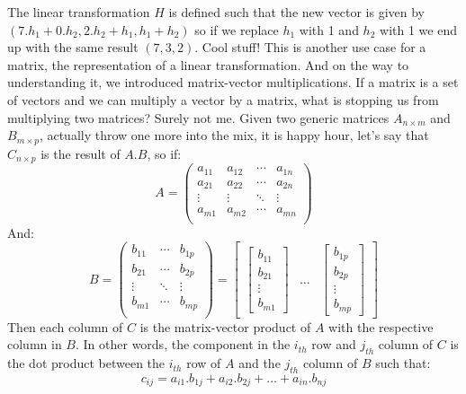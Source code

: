 \documentclass[600paper, 11pt,twoside,openany]{kdp}
\begin{document}
\indent The linear transformation $H$ is defined such that the new vector is given by $(7.h_1 + 0.h_2, 2.h_2+h_1, h_1+h_2)$ so if we replace $h_1$ with 1 and $h_2$ with 1 we end up with the same result $(7,3,2)$. Cool stuff! This is another use case for a matrix, the representation of a linear transformation. And on the way to understanding it, we introduced matrix-vector multiplications. If a matrix is a set of vectors and we can multiply a vector by a matrix, what is stopping us from multiplying two matrices? Surely not me. Given two generic matrices $A_{n\times m}$ and $B_{m\times p}$, actually throw one more into the mix, it is happy hour,  let’s say that  $C_{n\times p}$ is the result of $A.B$, so if:
\[ A = 
\begin{pmatrix}
a_{11} & a_{12} & \cdots & a_{1n}\\
a_{21} & a_{22} & \cdots & a_{2n}\\
\vdots & \vdots & \ddots & \vdots\\
a_{m1} & a_{m2} & \cdots & a_{mn}\\
\end{pmatrix}
\]
\indent And:
\[B = \begin{pmatrix}
b_{11} &  \cdots & b_{1p}\\
b_{21} &  \cdots & b_{2p}\\
\vdots & \ddots & \vdots\\
b_{m1} & \cdots & b_{mp}\\
\end{pmatrix} = 
\begin{bmatrix}
    \begin{bmatrix}
             b_{11} \\
             b_{21} \\
             \vdots \\
             b_{m1}
    \end{bmatrix}   &  \hdots & \begin{bmatrix}
             b_{1p} \\
             b_{2p} \\
             \vdots \\
             b_{mp}
    \end{bmatrix} 
\end{bmatrix}
\]
\indent Then each column of $C$ is the matrix-vector product of $A$ with the respective column in $B$. In other words, the component in the $i_{th}$ row and $j_{th}$ column of $C$ is the dot product between the $i_{th}$ row of $A$ and the $j_{th}$ column of $B$ such that:
\[
c_{ij}=a_{i1}.b_{1j}+a_{i2}.b_{2j}+\hdots+a_{in}.b_{nj}
\]
\end{document}
